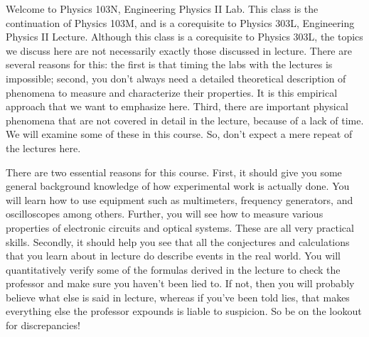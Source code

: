 Welcome to Physics 103N, Engineering Physics II Lab. This class is the 
continuation of Physics 103M, and is a corequisite to Physics 303L, 
Engineering Physics II Lecture. Although this class is a corequisite to 
Physics 303L, the topics we discuss here are not necessarily exactly those 
discussed in lecture. There are several reasons for this: the first is that 
timing the labs with the lectures is impossible; second, you don't always 
need a detailed theoretical description of phenomena to measure and 
characterize their properties. It is this empirical approach that we want to
emphasize here. Third, there are important physical phenomena that are not 
covered in detail in the lecture, because of a lack of time. We will examine 
some of these in this course. So, don't expect a mere repeat of the lectures 
here.

There are two essential reasons for this course. First, it should give you 
some general background knowledge of how experimental work is actually done. 
You will learn how to use equipment such as multimeters, frequency generators,
and oscilloscopes among others. Further, you will see how to measure various 
properties of electronic circuits and optical systems. These are all very 
practical skills. Secondly, it should help you see that all the conjectures 
and calculations that you learn about in lecture do describe events in the 
real world. You will quantitatively verify some of the formulas derived in
the lecture to check the professor and make sure you haven't been lied to. If 
not, then you will probably believe what else is said in lecture, whereas if 
you've been told lies, that makes everything else the professor expounds is
liable to suspicion. So be on the lookout for discrepancies!

